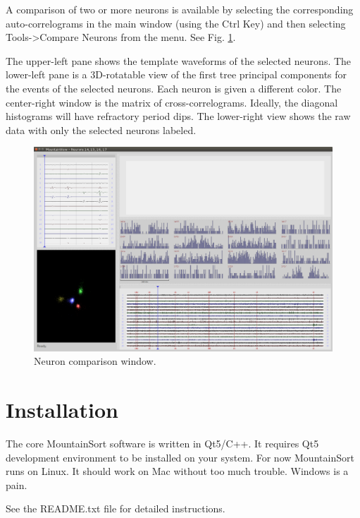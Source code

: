 \documentclass[hidelinks,10pt]{article}
\begin{document}
A comparison of two or more neurons is available by selecting the corresponding auto-correlograms in the main window (using the Ctrl Key) and then selecting Tools->Compare Neurons from the menu. See Fig. \ref{fig:mountainview_compare_window}.

The upper-left pane shows the template waveforms of the selected neurons. The lower-left pane is a 3D-rotatable view of the first tree principal components for the events of the selected neurons. Each neuron is given a different color. The center-right window is the matrix of cross-correlograms. Ideally, the diagonal histograms will have refractory period dips. The lower-right view shows the raw data with only the selected neurons labeled.

\begin{figure}[!h]
\centering
\includegraphics[width=6in]{images/mountainview_compare_window.png}
\caption{
Neuron comparison window.
}
\label{fig:mountainview_compare_window}
\end{figure}



\section {Installation}

The core MountainSort software is written in Qt5/C++. It requires Qt5 development environment to be installed on your system. For now MountainSort runs on Linux. It should work on Mac without too much trouble. Windows is a pain.

See the README.txt file for detailed instructions.
\end{document}
